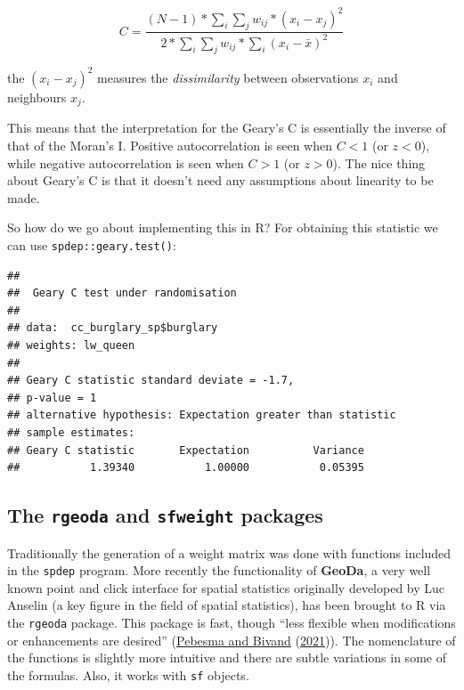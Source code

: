 \documentclass[
  krantz2]{krantz}
\makeatletter
\newenvironment{Shaded}{\begin{snugshade}}{\end{snugshade}}
\newcommand{\FunctionTok}[1]{\textcolor[rgb]{0,0,0}{#1}}
\newcommand{\NormalTok}[1]{#1}
\newcommand{\SpecialCharTok}[1]{\textcolor[rgb]{0,0,0}{#1}}
\newenvironment{kframe}{%
\medskip{}
\setlength{\fboxsep}{.8em}
 \def\at@end@of@kframe{}%
 \ifinner\ifhmode%
  \def\at@end@of@kframe{\end{minipage}}%
  \begin{minipage}{\columnwidth}%
 \fi\fi%
 \def\FrameCommand##1{\hskip\@totalleftmargin \hskip-\fboxsep
 \colorbox{shadecolor}{##1}\hskip-\fboxsep
     \hskip-\linewidth \hskip-\@totalleftmargin \hskip\columnwidth}%
 \MakeFramed {\advance\hsize-\width
   \@totalleftmargin\z@ \linewidth\hsize
   \@setminipage}}%
 {\par\unskip\endMakeFramed%
 \at@end@of@kframe}
\renewenvironment{Shaded}{\begin{kframe}}{\end{kframe}}
\makeatother
\begin{document}
\[C = \frac{(N-1)*\sum_i\sum_j w_{ij}*(x_i - x_j)^2}{2* \sum_i\sum_j w_{ij}* \sum_i(x_i - \bar{x})^2}\]

the \((x_i - x_j)^2\) measures the \emph{dissimilarity} between observations \(x_i\) and neighbours \(x_j\).

This means that the interpretation for the Geary's C is essentially the inverse of that of the Moran's I. Positive autocorrelation is seen when \(C < 1\) (or \(z < 0\)), while negative autocorrelation is seen when \(C > 1\) (or \(z > 0\)). The nice thing about Geary's C is that it doesn't need any assumptions about linearity to be made.

So how do we go about implementing this in R? For obtaining this statistic we can use \texttt{spdep::geary.test()}:

\begin{Shaded}
\end{Shaded}

\begin{verbatim}
## 
##  Geary C test under randomisation
## 
## data:  cc_burglary_sp$burglary 
## weights: lw_queen 
## 
## Geary C statistic standard deviate = -1.7,
## p-value = 1
## alternative hypothesis: Expectation greater than statistic
## sample estimates:
## Geary C statistic       Expectation          Variance 
##           1.39340           1.00000           0.05395
\end{verbatim}

\hypertarget{the-rgeoda-and-sfweight-packages}{%
\subsection{\texorpdfstring{The \texttt{rgeoda} and \texttt{sfweight} packages}{The rgeoda and sfweight packages}}\label{the-rgeoda-and-sfweight-packages}}

Traditionally the generation of a weight matrix was done with functions included in the \texttt{spdep} program. More recently the functionality of \textbf{GeoDa}, a very well known point and click interface for spatial statistics originally developed by Luc Anselin (a key figure in the field of spatial statistics), has been brought to R via the \texttt{rgeoda} package. This package is fast, though ``less flexible when modifications or enhancements are desired'' (\protect\hyperlink{ref-Pebesma_2021}{Pebesma and Bivand} (\protect\hyperlink{ref-Pebesma_2021}{2021})). The nomenclature of the functions is slightly more intuitive and there are subtle variations in some of the formulas. Also, it works with \texttt{sf} objects.
\end{document}
